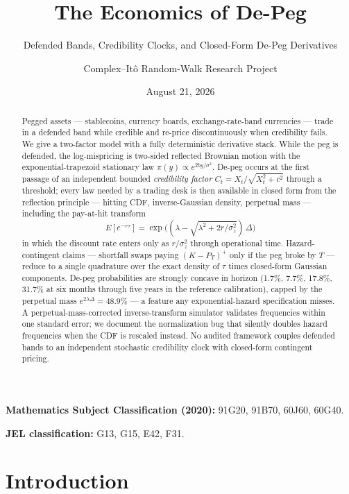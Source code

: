 \documentclass[
  english,
  10pt,
  letterpaper,
  DIV=11,
  numbers=noendperiod]{scrartcl}
\title{The Economics of De-Peg}
\subtitle{Defended Bands, Credibility Clocks, and Closed-Form De-Peg
Derivatives}
\author{Complex--Itô Random-Walk Research Project}
\date{August 21, 2026}
\renewcommand*\contentsname{Table of contents}
\newcommand\contentsname{Table of contents}
\begin{document}
\maketitle
\begin{abstract}
Pegged assets --- stablecoins, currency boards, exchange-rate-band
currencies --- trade in a defended band while credible and re-price
discontinuously when credibility fails. We give a two-factor model with
a fully deterministic derivative stack. While the peg is defended, the
log-mispricing is two-sided reflected Brownian motion with the
exponential-trapezoid stationary law \(\pi(y)\propto e^{2by/\sigma^2}\).
De-peg occurs at the first passage of an independent bounded
\emph{credibility factor} \(C_t=X_t/\sqrt{X_t^2+c^2}\) through a
threshold; every law needed by a trading desk is then available in
closed form from the reflection principle --- hitting CDF,
inverse-Gaussian density, perpetual mass --- including the pay-at-hit
transform
\[E[e^{-r\tau}]=\exp\Big((\lambda-\sqrt{\lambda^2+2r/\sigma_z^2})\,
\Delta\Big)\] in which the discount rate enters only as \(r/\sigma_z^2\)
through operational time. Hazard-contingent claims --- shortfall swaps
paying \((K-P_T)^+\) only if the peg broke by \(T\) --- reduce to a
single quadrature over the exact density of \(\tau\) times closed-form
Gaussian components. De-peg probabilities are strongly concave in
horizon (1.7\%, 7.7\%, 17.8\%, 31.7\% at six months through five years
in the reference calibration), capped by the perpetual mass
\(e^{2\lambda\Delta}=48.9\%\) --- a feature any exponential-hazard
specification misses. A perpetual-mass-corrected inverse-transform
simulator validates frequencies within one standard error; we document
the normalization bug that silently doubles hazard frequencies when the
CDF is rescaled instead. No audited framework couples defended bands to
an independent stochastic credibility clock with closed-form contingent
pricing.
\end{abstract}

\renewcommand*\contentsname{Table of contents}
{
\setcounter{tocdepth}{2}
\tableofcontents
}

\textbf{Mathematics Subject Classification (2020):} 91G20, 91B70, 60J60,
60G40.

\textbf{JEL classification:} G13, G15, E42, F31.

\section{Introduction}\label{sec-introduction}
\end{document}
